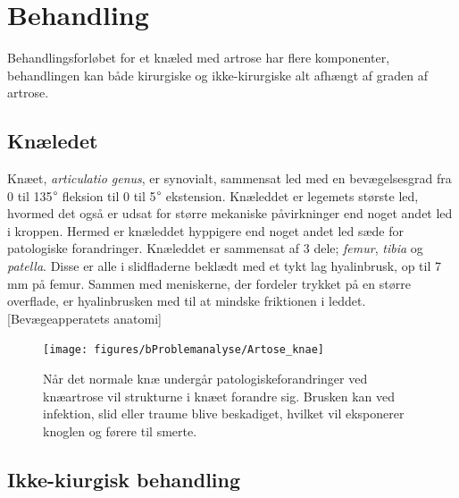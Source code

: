 \section{Behandling}
Behandlingsforløbet for et knæled med artrose har flere komponenter, behandlingen kan både kirurgiske og ikke-kirurgiske alt afhængt af graden af artrose.
\subsection*{Knæledet}
Knæet, \textit{articulatio genus}, er synovialt, sammensat led med en bevægelsesgrad fra 0 til 135$\degree$ fleksion til 0 til 5$\degree$ ekstension. Knæleddet er legemets største led, hvormed det også er udsat for større mekaniske påvirkninger end noget andet led i kroppen. Hermed er knæleddet hyppigere end noget andet led sæde for patologiske forandringer. Knæleddet er sammensat af 3 dele; \textit{femur}, \textit{tibia} og \textit{patella}. Disse er alle i slidfladerne beklædt med et tykt lag hyalinbrusk, op til 7 mm på femur. Sammen med meniskerne, der fordeler trykket på en større overflade, er hyalinbrusken med til at mindske friktionen i leddet. [Bevægeapperatets anatomi]

\begin{figure}[H] 
\begin{center}
\texttt{[image: figures/bProblemanalyse/Artose\_knae]}
\end{center}
\caption{Når det normale knæ undergår patologiskeforandringer ved knæartrose vil strukturne i knæet forandre sig. Brusken kan ved infektion, slid eller traume blive beskadiget, hvilket vil eksponerer knoglen og førere til smerte.\citep{schroder} \citep{adobe}} 
\label{fig:tka_implant} 
\end{figure}

\subsection{Ikke-kiurgisk behandling}

